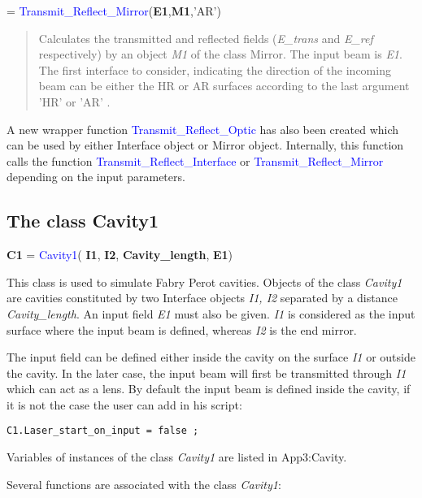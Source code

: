 = \textcolor{blue}{Transmit\_Reflect\_Mirror}(\textbf{E1},\textbf{M1},'AR')
\vspace*{-0.2cm}
\begin{quote}
Calculates the transmitted and reflected fields (\textsl{E\_trans} and \textsl{E\_ref} respectively) by an object \textsl{M1} of the class Mirror. The input beam is \textsl{E1}. The first interface to consider, indicating the direction of the incoming beam can be either the HR or AR surfaces according to the last argument 'HR' or 'AR' .
\end{quote}

A new wrapper function \textcolor{blue}{Transmit\_Reflect\_Optic} has also been created which can be used by either Interface object or Mirror object. Internally, this function calls the function \textcolor{blue}{Transmit\_Reflect\_Interface} or \textcolor{blue}{Transmit\_Reflect\_Mirror} depending on the input parameters.

\subsection{The class Cavity1}
\textbf{C1} = \textcolor{blue}{Cavity1}( \textbf{I1}, \textbf{I2}, \textbf{Cavity\_length}, \textbf{E1})

This class is used to simulate Fabry Perot cavities. Objects of the class \textsl{Cavity1} are cavities constituted by two Interface objects \textsl{I1, I2} separated by a distance \textsl{Cavity\_length}. An input field \textsl{E1} must also be given. \textsl{I1} is considered as the input surface where the input beam is defined, whereas \textsl{I2} is the end mirror.

The input field can be defined either inside the cavity on the surface \textsl{I1} or outside the cavity. In the later case, the input beam will first be transmitted through \textsl{I1} which can act as a lens. By default the input beam is defined inside the cavity, if it is not the case the user can add in his script:
\begin{verbatim}
C1.Laser_start_on_input = false ;
\end{verbatim}

Variables of instances of the class \textsl{Cavity1} are listed in {App3:Cavity}.

\noindent Several functions are associated with the class \textsl{Cavity1}:

